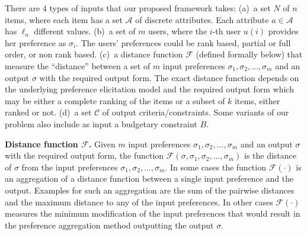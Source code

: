 \documentclass[11pt]{article}
\begin{document}
There are $4$ types of inputs that our proposed framework takes: (a)~a set $N$ of $n$ items, where each item has a set $\mathcal{A}$ of discrete attributes.  Each attribute $a\in \mathcal{A}$ has $\ell_a$ different values. (b)~a set of $m$ users, where the $i$-th user $u(i)$ provides her preference as $\sigma_i$. The users' preferences could be rank based, partial or full order, or non rank based. (c)~a distance function $\mathcal{F}$ (defined formally below) that measure the ``distance'' between a set of $m$ input preferences  $\sigma_1, \sigma_2,\ldots, \sigma_m$ and an output $\sigma$ with the required output form. The exact distance function depends on the underlying preference elicitation model and the required output form which may be either a complete ranking of the items or a subset of $k$ items, either ranked or not. (d)~a set $\mathcal{C}$ of output criteria/constraints. Some variants of our problem also include as input a budgetary constraint $B$.


\begin{definition}\label{def4}
\vspace{-0.1in}
{\bf Distance function $\mathcal{F}$.} Given $m$ input preferences  $\sigma_1, \sigma_2,\ldots, \sigma_m$ and an output $\sigma$ with the required output form, the function $\mathcal{F}(\sigma, \sigma_1, \sigma_2,\ldots, \sigma_m)$ is the distance of $\sigma$ from the input preferences  $\sigma_1, \sigma_2,\ldots, \sigma_m$.
In some cases the function $\mathcal{F}(\cdot)$ is an aggregation of a distance function between a single input preference and the output. Examples for such an aggregation are the sum of the pairwise distances and the maximum distance to any of the input preferences. In other cases $\mathcal{F}(\cdot)$ measures the minimum modification of the input preferences that would result in the preference aggregation method outputting the output $\sigma$. 
\end{definition}
\end{document}
